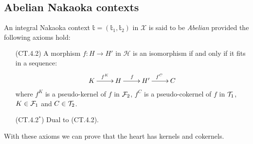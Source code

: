 \subsection{Abelian Nakaoka contexts}


\begin{definition}
An integral Nakaoka context $\mathbb{t}=(\mathbb{t}_1,\mathbb{t}_2)$ in $\mathcal{X}$ is said to be {\em Abelian} provided the following axioms hold:
\begin{enumerate}
\item[(CT.4.2)] A morphism $f\colon H\to H'$ in $\mathcal{H}$ is an isomorphism if and only if it fits in a sequence:
\[
\xymatrix{
K\ar[r]^{f^K}&H\ar[r]^f&H'\ar[r]^{f^C}&C
}
\]
where $f^K$ is a pseudo-kernel of $f$ in $\mathcal F_2$, $f^C$ is a pseudo-cokernel of $f$ in $\mathcal T_1$, $K\in \mathcal F_1$ and $C\in \mathcal T_2$.
\item[(CT.4.2$^*$)] Dual to (CT.4.2).
\end{enumerate}
\end{definition}

With these axioms we can prove that the heart has kernels and cokernels.

